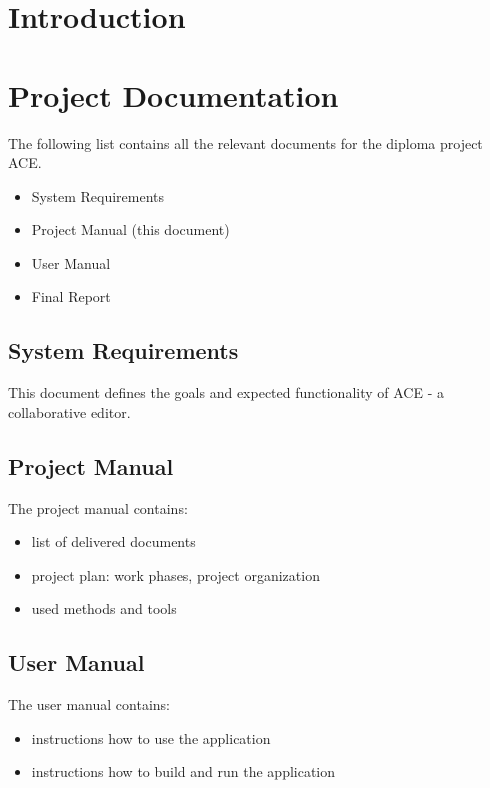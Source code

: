 \documentclass[11pt,a4paper]{article}
\begin{document}


\tableofcontents

\newpage

\section{Introduction}

\section{Project Documentation}
The following list contains all the relevant documents for the diploma project ACE.
\begin{itemize}
 \item System Requirements
 \item Project Manual (this document)
 \item User Manual
 \item Final Report
\end{itemize}

\subsection{System Requirements}
This document defines the goals and expected functionality of ACE - a collaborative editor.

\subsection{Project Manual}
The project manual contains:
\begin{itemize}
 \item list of delivered documents
 \item project plan: work phases, project organization
 \item used methods and tools
\end{itemize}

\subsection{User Manual}
The user manual contains:
\begin{itemize}
 \item instructions how to use the application
 \item instructions how to build and run the application
\end{itemize}
\end{document}
